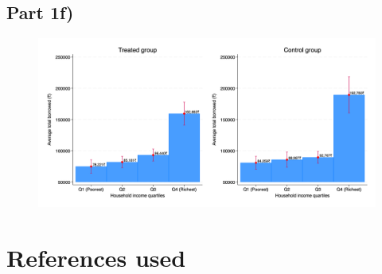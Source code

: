 \documentclass[12pt]{article}
\begin{document}
\subsection*{Part 1f)}

\begin{figure}[H]
    \centering
    \includegraphics[width=\textwidth]{figures/figure03_loansbar.png}
\end{figure}


\section{References used}
\end{document}
